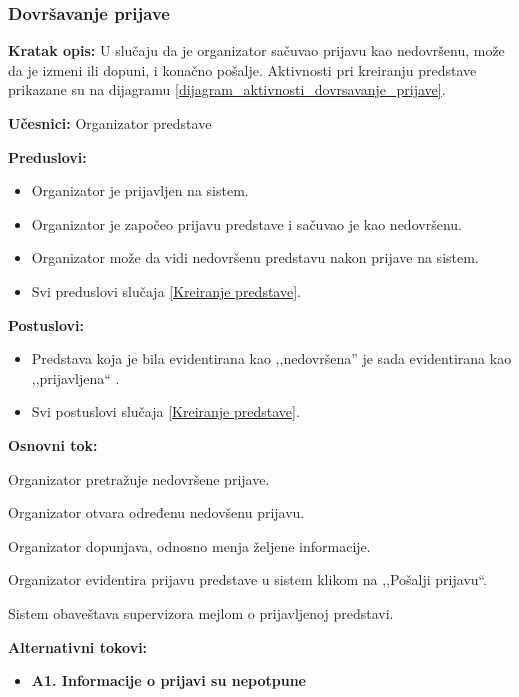 \documentclass[a4paper]{article}
\begin{document}
\subsubsection{Dovršavanje prijave} \label{Dovršavanje prijave}
\noindent\textbf{Kratak opis:} U slučaju da je organizator sačuvao prijavu kao nedovršenu, može da je izmeni ili dopuni, i konačno pošalje. Aktivnosti pri kreiranju predstave prikazane su na dijagramu \ref{dijagram_aktivnosti_dovrsavanje_prijave}.

\noindent\textbf{Učesnici:} Organizator predstave

\noindent\textbf{Preduslovi:}
  \begin{itemize}
    \item Organizator je prijavljen na sistem.
    \item Organizator je započeo prijavu predstave i sačuvao je kao nedovršenu.
    \item Organizator može da vidi nedovršenu predstavu nakon prijave na sistem.
    \item Svi preduslovi slučaja \ref{Kreiranje predstave}.
  \end{itemize}

\noindent\textbf{Postuslovi:} 
  \begin{itemize}
    \item Predstava koja je bila evidentirana kao ,,nedovršena'' je sada evidentirana kao ,,prijavljena`` .
    \item Svi postuslovi slučaja \ref{Kreiranje predstave}.
  \end{itemize}

\noindent\textbf{Osnovni tok:}
  \begin{legal}
    \item Organizator pretražuje nedovršene prijave.
    \item Organizator otvara određenu nedovšenu prijavu. 
    \item Organizator dopunjava, odnosno menja željene informacije.
    \item Organizator evidentira prijavu predstave u sistem klikom na ,,Pošalji prijavu``. 
    \item Sistem obaveštava supervizora mejlom o prijavljenoj predstavi.
  \end{legal}

\noindent\textbf{Alternativni tokovi:} 
\begin{itemize}
  \item \textbf{A1. Informacije o prijavi su nepotpune} 
\end{itemize}
\end{document}
